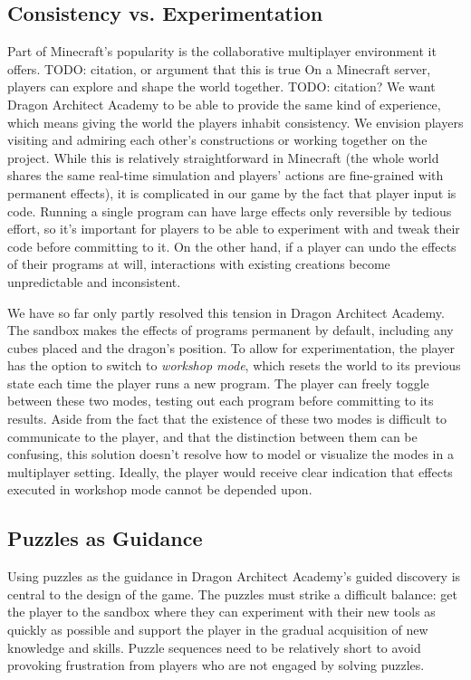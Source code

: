 \documentclass{sig-alternate}
\newcommand{\TODO}[1]{{\color{red} TODO: #1}}
\newcommand{\gametitle}{{\color{RoyalPurple} Dragon Architect Academy}}
\begin{document}
\subsection{Consistency vs. Experimentation}
Part of Minecraft's popularity is the collaborative multiplayer environment it offers. \TODO{citation, or argument that this is true}
On a Minecraft server, players can explore and shape the world together. \TODO{citation?} 
We want \gametitle{} to be able to provide the same kind of experience, which means giving the world the players inhabit consistency. 
We envision players visiting and admiring each other's constructions or working together on the project. 
While this is relatively straightforward in Minecraft (the whole world shares the same real-time simulation and players' actions are fine-grained with permanent effects), it is complicated in our game by the fact that player input is code. 
Running a single program can have large effects only reversible by tedious effort, so it's important for players to be able to experiment with and tweak their code before committing to it. 
On the other hand, if a player can undo the effects of their programs at will, interactions with existing creations become unpredictable and inconsistent. 

We have so far only partly resolved this tension in \gametitle{}. 
The sandbox makes the effects of programs permanent by default, including any cubes placed and the dragon's position.
To allow for experimentation, the player has the option to switch to \emph{workshop mode}, which resets the world to its previous state each time the player runs a new program. 
The player can freely toggle between these two modes, testing out each program before committing to its results. 
Aside from the fact that the existence of these two modes is difficult to communicate to the player, and that the distinction between them can be confusing, this solution doesn't resolve how to model or visualize the modes in a multiplayer setting. 
Ideally, the player would receive clear indication that effects executed in workshop mode cannot be depended upon.

\subsection{Puzzles as Guidance}
\label{sec:direct_guidance}

Using puzzles as the guidance in \gametitle{}'s guided discovery is central to the design of the game. 
The puzzles must strike a difficult balance: get the player to the sandbox where they can experiment with their new tools as quickly as possible and support the player in the gradual acquisition of new knowledge and skills. 
Puzzle sequences need to be relatively short to avoid provoking frustration from players who are not engaged by solving puzzles. 
\end{document}
